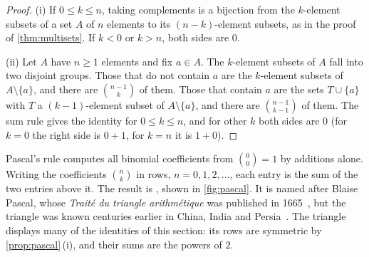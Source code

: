 \begin{proof}
(i) If $0\le k\le n$, taking complements is a bijection from the $k$-element subsets of a set $A$ of $n$ elements to its $(n-k)$-element subsets, as in the proof of \cref{thm:multisets}. If $k<0$ or $k>n$, both sides are $0$.

(ii) Let $A$ have $n\ge1$ elements and fix $a\in A$. The $k$-element subsets of $A$ fall into two disjoint groups. Those that do not contain $a$ are the $k$-element subsets of $A\setminus\{a\}$, and there are $\binom{n-1}{k}$ of them. Those that contain $a$ are the sets $T\cup\{a\}$ with $T$ a $(k-1)$-element subset of $A\setminus\{a\}$, and there are $\binom{n-1}{k-1}$ of them. The sum rule gives the identity for $0\le k\le n$, and for other $k$ both sides are $0$ (for $k=0$ the right side is $0+1$, for $k=n$ it is $1+0$).
\end{proof}

Pascal's rule computes all binomial coefficients from $\binom00=1$ by additions alone. Writing the coefficients $\binom nk$ in rows, $n=0,1,2,\ldots$, each entry is the sum of the two entries above it. The result is , shown in \cref{fig:pascal}. It is named after Blaise Pascal, whose \emph{Trait\'e du triangle arithm\'etique} was published in 1665~\cite{pascal1665}, but the triangle was known centuries earlier in China, India and Persia~\cite{edwards1987pascal}. The triangle displays many of the identities of this section: its rows are symmetric by \cref{prop:pascal}\,(i), and their sums are the powers of $2$.

\begin{figure}
\end{figure}

